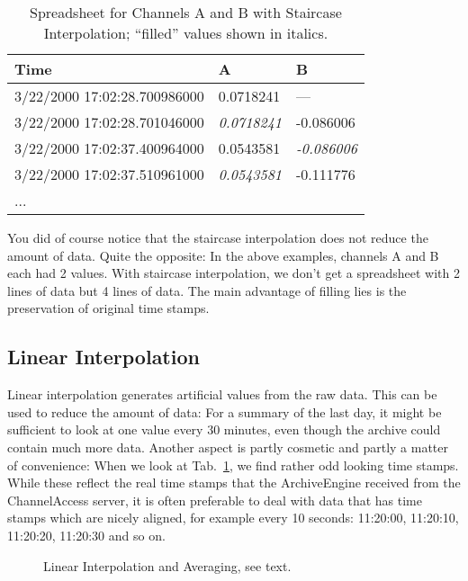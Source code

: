 \begin{table}[htbp]
  \begin{center}
    \begin{tabular}[t]{l|l|l}
      Time                         & A         & B         \\
      \hline
      3/22/2000 17:02:28.700986000 & 0.0718241 & ---       \\
      3/22/2000 17:02:28.701046000 & \textit{0.0718241}      & -0.086006 \\
      3/22/2000 17:02:37.400964000 & 0.0543581 & \textit{-0.086006} \\
      3/22/2000 17:02:37.510961000 & \textit{0.0543581} & -0.111776 \\
      ...
    \end{tabular}
    \caption{Spreadsheet for Channels A and B with Staircase
      Interpolation; ``filled'' values shown in italics.}
    \label{tab:ABstair}
  \end{center}
\end{table}

You did of course notice that the staircase interpolation does not
reduce the amount of data. Quite the opposite: In the above examples,
channels A and B each had 2 values. With staircase interpolation, we
don't get a spreadsheet with 2 lines of data but 4 lines of data.  The
main advantage of filling lies is the preservation of original time stamps.

\subsection{Linear Interpolation}
Linear interpolation generates artificial values from the raw
data. This can be used to reduce the amount of data: For a summary of
the last day, it might be sufficient to look at one value every 30
minutes, even though the archive could contain much more data.
Another aspect is partly cosmetic and partly a matter of convenience:
When we look at Tab.~\ref{tab:ABstair}, we find rather odd looking
time stamps. While these reflect the real time stamps that the
ArchiveEngine received from the ChannelAccess server, it is often
preferable to deal with data that has time stamps which are nicely
aligned, for example every 10 seconds: 11:20:00, 11:20:10, 11:20:20,
11:20:30 and so on.

\begin{figure}[htb]
\begin{center}
\medskip
{}
\end{center}
\caption{\label{fig:interpol}Linear Interpolation and Averaging, see text.}
\end{figure}

